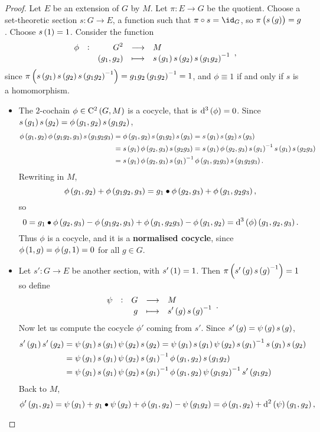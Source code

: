 \begin{proof}
Let $ E $ be an extension of $ G $ by $ M $. Let $ \pi : E \to G $ be the quotient. Choose a set-theoretic section $ s : G \to E $, a function such that $ \pi \circ s = \id_G $, so $ \pi\br{s\br{g}} = g $. Choose $ s\br{1} = 1 $. Consider the function
$$ \function[\phi]{G^2}{M}{\br{g_1, g_2}}{s\br{g_1}s\br{g_2}s\br{g_1g_2}^{-1}}, $$
since $ \pi\br{s\br{g_1}s\br{g_2}s\br{g_1g_2}^{-1}} = g_1g_2\br{g_1g_2}^{-1} = 1 $, and $ \phi \equiv 1 $ if and only if $ s $ is a homomorphism.
\begin{itemize}
\item The $ 2 $-cochain $ \phi \in \C^2\br{G, M} $ is a cocycle, that is $ \d^3\br{\phi} = 0 $. Since $ s\br{g_1}s\br{g_2} = \phi\br{g_1, g_2}s\br{g_1g_2} $,
\begin{align*}
\phi\br{g_1, g_2}\phi\br{g_1g_2, g_3}s\br{g_1g_2g_3}
& = \phi\br{g_1, g_2}s\br{g_1g_2}s\br{g_3}
= s\br{g_1}s\br{g_2}s\br{g_3} \\
& = s\br{g_1}\phi\br{g_2, g_3}s\br{g_2g_3}
= s\br{g_1}\phi\br{g_2, g_3}s\br{g_1}^{-1}s\br{g_1}s\br{g_2g_3} \\
& = s\br{g_1}\phi\br{g_2, g_3}s\br{g_1}^{-1}\phi\br{g_1, g_2g_3}s\br{g_1g_2g_3}.
\end{align*}
Rewriting in $ M $,
$$ \phi\br{g_1, g_2} + \phi\br{g_1g_2, g_3} = g_1 \bullet \phi\br{g_2, g_3} + \phi\br{g_1, g_2g_3}, $$
so
$$ 0 = g_1 \bullet \phi\br{g_2, g_3} - \phi\br{g_1g_2, g_3} + \phi\br{g_1, g_2g_3} - \phi\br{g_1, g_2} = \d^3\br{\phi}\br{g_1, g_2, g_3}. $$
Thus $ \phi $ is a cocycle, and it is a \textbf{normalised cocycle}, since $ \phi\br{1, g} = \phi\br{g, 1} = 0 $ for all $ g \in G $.
\item Let $ s' : G \to E $ be another section, with $ s'\br{1} = 1 $. Then $ \pi\br{s'\br{g}s\br{g}^{-1}} = 1 $ so define
$$ \function[\psi]{G}{M}{g}{s'\br{g}s\br{g}^{-1}}. $$
Now let us compute the cocycle $ \phi' $ coming from $ s' $. Since $ s'\br{g} = \psi\br{g}s\br{g} $,
\begin{align*}
s'\br{g_1}s'\br{g_2}
& = \psi\br{g_1}s\br{g_1}\psi\br{g_2}s\br{g_2}
= \psi\br{g_1}s\br{g_1}\psi\br{g_2}s\br{g_1}^{-1}s\br{g_1}s\br{g_2} \\
& = \psi\br{g_1}s\br{g_1}\psi\br{g_2}s\br{g_1}^{-1}\phi\br{g_1, g_2}s\br{g_1g_2} \\
& = \psi\br{g_1}s\br{g_1}\psi\br{g_2}s\br{g_1}^{-1}\phi\br{g_1, g_2}\psi\br{g_1g_2}^{-1}s'\br{g_1g_2}
\end{align*}
Back to $ M $,
$$ \phi'\br{g_1, g_2} = \psi\br{g_1} + g_1 \bullet \psi\br{g_2} + \phi\br{g_1, g_2} - \psi\br{g_1g_2} = \phi\br{g_1, g_2} + \d^2\br{\psi}\br{g_1, g_2}, $$

\end{itemize}
\end{proof}

